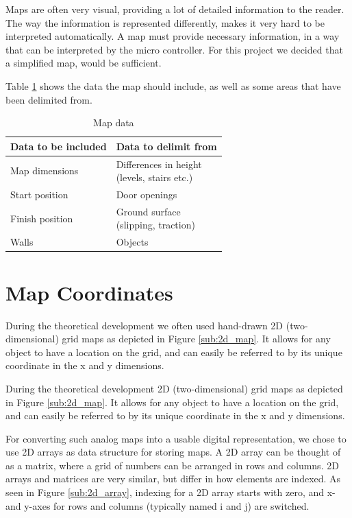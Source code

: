 Maps are often very visual, providing a lot of detailed information to the reader.
The way the information is represented differently,
makes it very hard to be interpreted automatically.
A map must provide necessary information,
in a way that can be interpreted by the micro controller.
For this project we decided that a simplified map, would be sufficient.

Table \ref{table:map_data} shows the data the map should include,
as well as some areas that have been delimited from.

\begin{table}[h!]
	\centering
	\caption{Map data}
	\begin{tabular}{|p{}||p{}|}
		\hline
		Data to be included & Data to delimit from \\ 
		\hline
		Map dimensions 		& \parbox[t]{0.4\textwidth}{Differences in height\\(levels, stairs etc.)}\\
		\hline
		Start position 		& Door openings \\
		\hline
		Finish position 	& \parbox[t]{0.4\textwidth}{Ground surface\\(slipping, traction)} \\
		\hline
		Walls 				& Objects\\
		\hline
	\end{tabular}
	\label{table:map_data}
\end{table}


\section{Map Coordinates}
\label{sec:map_coordinates} %
During the theoretical development we often used hand-drawn 2D (two-dimensional) grid maps as depicted in Figure \ref{sub:2d_map}. It allows for any object to have a location on the grid, and can easily be referred to by its unique coordinate in the x and y dimensions. 

During the theoretical development 2D (two-dimensional) grid maps as depicted in Figure \ref{sub:2d_map}. It allows for any object to have a location on the grid, and can easily be referred to by its unique coordinate in the x and y dimensions. 

For converting such analog maps into a usable digital representation, we chose to use 2D arrays as data structure for storing maps. A 2D array can be thought of as a matrix, where a grid of numbers can be arranged in rows and columns. 2D arrays and matrices are very similar, but differ in how elements are indexed. As seen in Figure \ref{sub:2d_array}, indexing for a 2D array starts with zero, and x- and y-axes for rows and columns (typically named i and j) are switched.  

